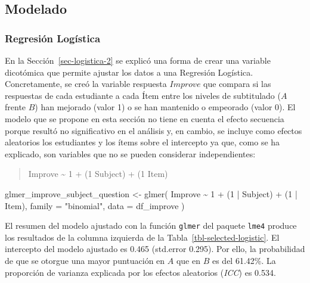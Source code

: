 \documentclass[
  12pt,
  a4paper,
  extrafontsizes,
  onecolumn,
  openright,
  table]{memoir}
\newenvironment{Shaded}{\begin{snugshade}}{\end{snugshade}}
\newcommand{\AttributeTok}[1]{\textcolor[rgb]{0.40,0.45,0.13}{#1}}
\newcommand{\DecValTok}[1]{\textcolor[rgb]{0.68,0.00,0.00}{#1}}
\newcommand{\FunctionTok}[1]{\textcolor[rgb]{0.28,0.35,0.67}{#1}}
\newcommand{\NormalTok}[1]{\textcolor[rgb]{0.00,0.23,0.31}{#1}}
\newcommand{\OtherTok}[1]{\textcolor[rgb]{0.00,0.23,0.31}{#1}}
\newcommand{\SpecialCharTok}[1]{\textcolor[rgb]{0.37,0.37,0.37}{#1}}
\newcommand{\StringTok}[1]{\textcolor[rgb]{0.13,0.47,0.30}{#1}}
\begin{document}
\hypertarget{modelado}{%
\subsection{Modelado}\label{modelado}}

\hypertarget{sec-logistica-3}{%
\subsubsection{Regresión Logística}\label{sec-logistica-3}}

En la Sección~\ref{sec-logistica-2} se explicó una forma de crear una
variable dicotómica que permite ajustar los datos a una Regresión
Logística. Concretamente, se creó la variable respuesta \(Improve\) que
compara si las respuestas de cada estudiante a cada Ítem entre los
niveles de subtitulado (\(A\) frente \(B\)) han mejorado (valor 1) o se
han mantenido o empeorado (valor 0). El modelo que se propone en esta
sección no tiene en cuenta el \gls{efecto secuencia} porque resultó no
significativo en el análisis y, en cambio, se incluye como efectos
aleatorios los estudiantes y los ítems sobre el intercepto ya que, como
se ha explicado, son variables que no se pueden considerar
independientes:

\begin{quote}
Improve \textasciitilde{} 1 + (1 \textbar{} Subject) + (1 \textbar{}
Item)
\end{quote}

\scriptsize

\begin{Shaded}
\begin{Highlighting}[]
\NormalTok{glmer\_improve\_subject\_question }\OtherTok{\textless{}{-}} \FunctionTok{glmer}\NormalTok{(}
\NormalTok{    Improve }\SpecialCharTok{\textasciitilde{}} \DecValTok{1} \SpecialCharTok{+}\NormalTok{ (}\DecValTok{1} \SpecialCharTok{|}\NormalTok{ Subject) }\SpecialCharTok{+}\NormalTok{ (}\DecValTok{1} \SpecialCharTok{|}\NormalTok{ Item),}
    \AttributeTok{family =} \StringTok{"binomial"}\NormalTok{, }\AttributeTok{data =}\NormalTok{ df\_improve}
\NormalTok{)}
\end{Highlighting}
\end{Shaded}

\normalsize

El resumen del modelo ajustado con la función \texttt{glmer} del paquete
\texttt{lme4} \autocite[ver][]{lme4} produce los resultados de la
columna izquierda de la Tabla~\ref{tbl-selected-logistic}. El intercepto
del modelo ajustado es 0.465 (std.error 0.295). Por ello, la
probabilidad de que se otorgue una mayor puntuación en \(A\) que en
\(B\) es del 61.42\%. La proporción de varianza explicada por los
efectos aleatorios (\emph{\gls{ICC}}) es 0.534.
\end{document}
